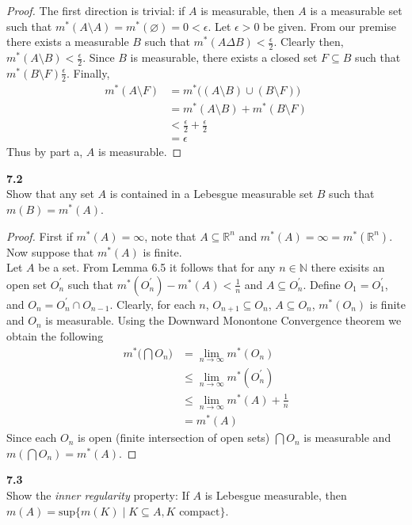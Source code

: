\documentclass[12pt]{article}
\newcommand{\problem}[1]{\hspace{-4 ex} \large \textbf{#1}\\}
\let\emptyset\varnothing
\begin{document}
	\begin{proof}
		The first direction is trivial: if $A$ is measurable, then $A$ is a measurable set such that $m^*(A \setminus A) = m^*(\emptyset) = 0 < \epsilon$. \bigbreak
		Let $\epsilon > 0$ be given. From our premise there exists a measurable $B$ such that $m^*(A \Delta B) < \tfrac{\epsilon}{2}$. Clearly then, $m^*(A \setminus B) < \tfrac{\epsilon}{2}$. Since $B$ is measurable, there exists a closed set $F \subseteq B$ such that $m^*(B \setminus F) \tfrac{\epsilon}{2}$. Finally,
		\begin{align*}
			m^*(A \setminus F) & = m^*\Big((A \setminus B) \cup (B \setminus F)\Big) \\
			& = m^*(A \setminus B) + m^*(B \setminus F) \\
			& < \tfrac{\epsilon}{2} + \tfrac{\epsilon}{2} \\
			& = \epsilon
		\end{align*}
		Thus by part a, $A$ is measurable.
	\end{proof}

\problem{7.2} Show that any set $A$ is contained in a Lebesgue measurable set $B$ such that $m(B)=m^*(A)$.

	\begin{proof}
		First if $m^*(A) = \infty$, note that $A \subseteq \mathbb{R}^n$ and $m^*(A) = \infty = m^*(\mathbb{R}^n)$. Now suppose that $m^*(A)$ is finite. \\
		Let $A$ be a set. From Lemma 6.5 it follows that for any $n \in \mathbb{N}$ there exisits an open set $O_n^\prime$ such that $m^*(O_n^\prime) - m^*(A) < \tfrac{1}{n}$ and $A \subseteq O_n^\prime$. Define $O_1 = O_1^\prime$, and $O_n = O_{n}^\prime \cap O_{n-1}$. Clearly, for each $n$, $O_{n+1} \subseteq O_n$, $A \subseteq O_n$, $m^*(O_n)$ is finite and $O_n$ is measurable. Using the Downward Monontone Convergence theorem we obtain the following
		\begin{align*}
			m^*\Big(\bigcap O_n \Big) & = \lim_{n \to \infty} m^*(O_n) \\
			& \leq \lim_{n \to \infty} m^*(O_n^\prime) \\
			& \leq \lim_{n \to \infty} m^*(A) + \tfrac{1}{n} \\
			& = m^*(A)
		\end{align*}
		Since each $O_n$ is open (finite intersection of open sets) $\bigcap O_n$ is measurable and $m(\bigcap O_n) = m^*(A)$.
	\end{proof}

\problem{7.3} Show the \emph{inner regularity} property: If $A$ is Lebesgue measurable, then $m(A)=\text{sup}\{m(K)\mid K\subseteq A, K\text{ compact}\}$.
\end{document}
